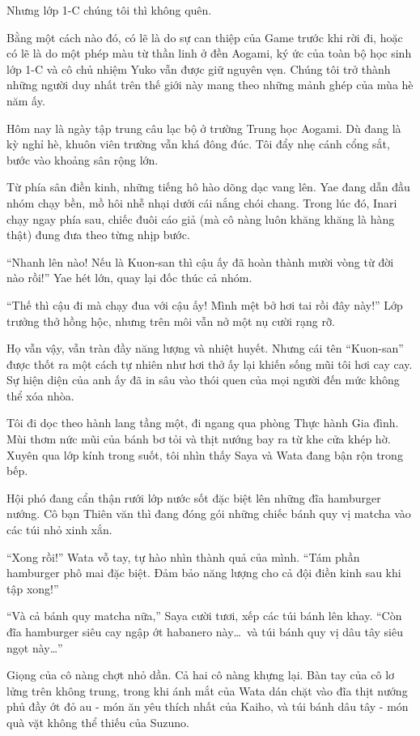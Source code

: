 \documentclass[../main.tex]{subfiles}
\begin{document}
Nhưng lớp 1-C chúng tôi thì không quên.

Bằng một cách nào đó, có lẽ là do sự can thiệp của Game trước khi rời đi, hoặc có lẽ là do một phép màu từ thần linh ở đền Aogami, ký ức của toàn bộ học sinh lớp 1-C và cô chủ nhiệm Yuko vẫn được giữ nguyên vẹn. Chúng tôi trở thành những người duy nhất trên thế giới này mang theo những mảnh ghép của mùa hè năm ấy.

Hôm nay là ngày tập trung câu lạc bộ ở trường Trung học Aogami. Dù đang là kỳ nghỉ hè, khuôn viên trường vẫn khá đông đúc. Tôi đẩy nhẹ cánh cổng sắt, bước vào khoảng sân rộng lớn.

Từ phía sân điền kinh, những tiếng hô hào dõng dạc vang lên. Yae đang dẫn đầu nhóm chạy bền, mồ hôi nhễ nhại dưới cái nắng chói chang. Trong lúc đó, Inari chạy ngay phía sau, chiếc đuôi cáo giả (mà cô nàng luôn khăng khăng là hàng thật) đung đưa theo từng nhịp bước.

``Nhanh lên nào! Nếu là Kuon-san thì cậu ấy đã hoàn thành mười vòng từ đời nào rồi!'' Yae hét lớn, quay lại đốc thúc cả nhóm.

``Thế thì cậu đi mà chạy đua với cậu ấy! Mình mệt bở hơi tai rồi đây này!'' Lớp trưởng thở hồng hộc, nhưng trên môi vẫn nở một nụ cười rạng rỡ.

Họ vẫn vậy, vẫn tràn đầy năng lượng và nhiệt huyết. Nhưng cái tên ``Kuon-san'' được thốt ra một cách tự nhiên như hơi thở ấy lại khiến sống mũi tôi hơi cay cay. Sự hiện diện của anh ấy đã in sâu vào thói quen của mọi người đến mức không thể xóa nhòa.

Tôi đi dọc theo hành lang tầng một, đi ngang qua phòng Thực hành Gia đình. Mùi thơm nức mũi của bánh bơ tỏi và thịt nướng bay ra từ khe cửa khép hờ. Xuyên qua lớp kính trong suốt, tôi nhìn thấy Saya và Wata đang bận rộn trong bếp.

Hội phó đang cẩn thận rưới lớp nước sốt đặc biệt lên những đĩa hamburger nướng. Cô bạn Thiên văn thì đang đóng gói những chiếc bánh quy vị matcha vào các túi nhỏ xinh xắn.

``Xong rồi!'' Wata vỗ tay, tự hào nhìn thành quả của mình. ``Tám phần hamburger phô mai đặc biệt. Đảm bảo năng lượng cho cả đội điền kinh sau khi tập xong!''

``Và cả bánh quy matcha nữa,'' Saya cười tươi, xếp các túi bánh lên khay. ``Còn đĩa hamburger siêu cay ngập ớt habanero này\dots\ và túi bánh quy vị dâu tây siêu ngọt này\dots''

Giọng của cô nàng chợt nhỏ dần. Cả hai cô nàng khựng lại. Bàn tay của cô lơ lửng trên không trung, trong khi ánh mắt của Wata dán chặt vào đĩa thịt nướng phủ đầy ớt đỏ au - món ăn yêu thích nhất của Kaiho, và túi bánh dâu tây - món quà vặt không thể thiếu của Suzuno.
\end{document}
